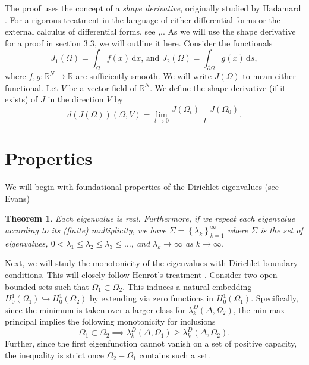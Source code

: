 \documentclass[12pt]{report}
\newtheorem{theorem}{Theorem}[section]
\numberwithin{definition}{section}
\begin{document}
The proof uses the concept of a \textit{shape derivative}, originally studied by Hadamard \cite{hadamard}.
For a rigorous treatment in the language of either differential forms or the external calculus of differential forms, see \cite{hadamard2},\cite{henrot2},\cite{shapeder1}.
As we will use the shape derivative for a proof in section $3.3$, we will outline it here.
Consider the functionals
\[
  J_{1}(\Omega) = \int_{ \Omega} \! f(x) \, \mathrm{d}x \text{, and } J_{2}(\Omega) = \int_{ \partial \Omega} \! g(x) \, \mathrm{d}s
,\] 
where $f,g : \mathbb{R}^{N} \to \mathbb{R}$ are sufficiently smooth.
We will write $J(\Omega)$ to mean either functional.
Let $V$ be a vector field of $\mathbb{R}^{N}$.
We define the shape derivative (if it exists) of $J$ in the direction $V$ by
\[
d(J(\Omega))(\Omega,V) = \lim_{t \to 0} \frac{J(\Omega_{t}) - J(\Omega_{0})}{t}
.\] 
\break

\section{Properties}

We will begin with foundational properties of the Dirichlet eigenvalues (see Evans\cite{evans})

\begin{theorem}
  Each eigenvalue is real.
  Furthermore, if we repeat each eigenvalue according to its (finite) multiplicity, we have
    $\Sigma = \left\{ \lambda_{k} \right\}_{k=1}^\infty$ 
    where $\Sigma$ is the set of eigenvalues, 
    $0 < \lambda_1 \leq \lambda_2 \leq \lambda_3 \leq \ldots$,
    and $\lambda_{k} \to \infty$ as $k \to \infty$.
    
\end{theorem}

Next, we will study the monotonicity of the eigenvalues with Dirichlet boundary conditions.
This will closely follow Henrot's treatment \cite{henrot}.
Consider two open bounded sets such that $\Omega_{1} \subset \Omega_{2}$.
This induces a natural embedding $H_{0}^{1}(\Omega_{1}) \hookrightarrow H_{0}^{1}(\Omega_{2})$ by extending via zero functions in $H_{0}^{1}(\Omega_{1})$.
Specifically, since the minimum is taken over a larger class for $\lambda_{k}^{D}(\Delta,\Omega_{2})$, the min-max principal implies the following monotonicity for inclusions
\[
\Omega_{1} \subset \Omega_{2} \implies \lambda_{k}^{D} (\Delta,\Omega_{1}) \geq \lambda_{k}^{D}(\Delta,\Omega_{2})
.\] 
Further, since the first eigenfunction cannot vanish on a set of positive capacity, the inequality is strict once $\Omega_{2} - \Omega_{1}$ contains such a set.
\end{document}
